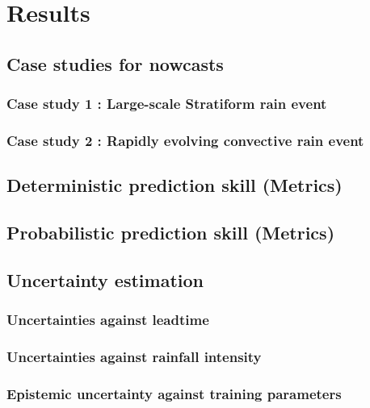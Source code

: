 \chapter{Results}
\label{chapter:results}

\section{Case studies for nowcasts}
\subsection{Case study 1 : Large-scale Stratiform rain event}
\subsection{Case study 2 : Rapidly evolving convective rain event}

\section{Deterministic prediction skill (Metrics)}

\section{Probabilistic prediction skill (Metrics)}

\section{Uncertainty estimation}
\subsection{Uncertainties against leadtime}
\subsection{Uncertainties against rainfall intensity}
\subsection{Epistemic uncertainty against training parameters}


 
